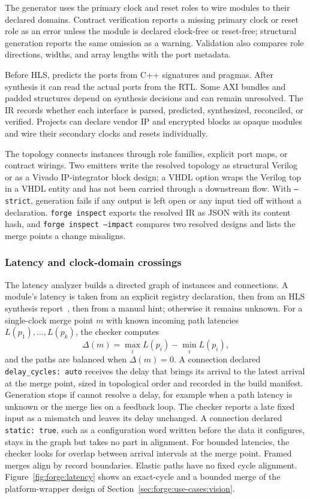 The generator uses the primary clock and reset roles to wire modules to their declared domains. Contract verification reports a missing primary clock or reset role as an error unless the module is declared clock-free or reset-free; structural generation reports the same omission as a warning. Validation also compares role directions, widths, and array lengths with the port metadata.

Before HLS, \forge{} predicts the ports from C++ signatures and pragmas. After synthesis it can read the actual ports from the RTL. Some AXI bundles and padded structures depend on synthesis decisions and can remain unresolved. The IR records whether each interface is parsed, predicted, synthesized, reconciled, or verified. Projects can declare vendor IP and encrypted blocks as opaque modules and wire their secondary clocks and resets individually.

The topology connects instances through role families, explicit port maps, or contract wirings. Two emitters write the resolved topology as structural Verilog or as a Vivado IP-integrator block design; a VHDL option wraps the Verilog top in a VHDL entity and has not been carried through a downstream flow. With \texttt{--strict}, generation fails if any output is left open or any input tied off without a declaration. \texttt{forge inspect} exports the resolved IR as JSON with its content hash, and \texttt{forge inspect --impact} compares two resolved designs and lists the merge points a change misaligns.

\subsubsection{Latency and clock-domain crossings}
\label{sec:forge:latency}
\label{sec:forge:cdc}

The latency analyzer builds a directed graph of instances and connections. A module's latency is taken from an explicit registry declaration, then from an HLS synthesis report~\cite{AMD_VitisHLS_UG1399}, then from a manual hint; otherwise it remains unknown. For a single-clock merge point $m$ with known incoming path latencies $L(p_1),\ldots,L(p_k)$, the checker computes
\[
\Delta(m)=\max_i L(p_i)-\min_i L(p_i),
\]
and the paths are balanced when $\Delta(m)=0$. A connection declared \texttt{delay\_cycles: auto} receives the delay that brings its arrival to the latest arrival at the merge point, sized in topological order and recorded in the build manifest. Generation stops if \forge{} cannot resolve a delay, for example when a path latency is unknown or the merge lies on a feedback loop. The checker reports a late fixed input as a mismatch and leaves its delay unchanged. A connection declared \texttt{static: true}, such as a configuration word written before the data it configures, stays in the graph but takes no part in alignment. For bounded latencies, the checker looks for overlap between arrival intervals at the merge point. Framed merges align by record boundaries. Elastic paths have no fixed cycle alignment. Figure~\ref{fig:forge:latency} shows an exact-cycle and a bounded merge of the platform-wrapper design of Section~\ref{sec:forge:use-cases:vision}.

